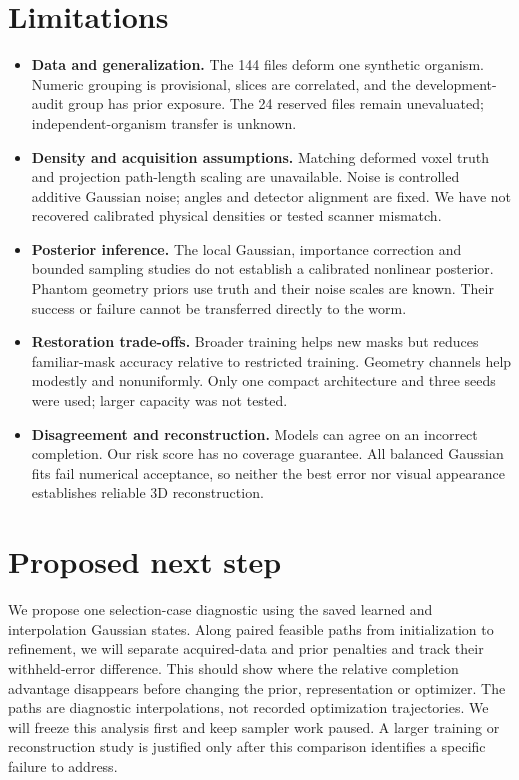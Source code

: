 \documentclass[11pt,a4paper]{article}
\begin{document}
\newpage
\section{Limitations}
\begin{itemize}
\item \textbf{Data and generalization.} The 144 files deform one synthetic organism. Numeric grouping is provisional, slices are correlated, and the development-audit group has prior exposure. The 24 reserved files remain unevaluated; independent-organism transfer is unknown.
\item \textbf{Density and acquisition assumptions.} Matching deformed voxel truth and projection path-length scaling are unavailable. Noise is controlled additive Gaussian noise; angles and detector alignment are fixed. We have not recovered calibrated physical densities or tested scanner mismatch.
\item \textbf{Posterior inference.} The local Gaussian, importance correction and bounded sampling studies do not establish a calibrated nonlinear posterior. Phantom geometry priors use truth and their noise scales are known. Their success or failure cannot be transferred directly to the worm.
\item \textbf{Restoration trade-offs.} Broader training helps new masks but reduces familiar-mask accuracy relative to restricted training. Geometry channels help modestly and nonuniformly. Only one compact architecture and three seeds were used; larger capacity was not tested.
\item \textbf{Disagreement and reconstruction.} Models can agree on an incorrect completion. Our risk score has no coverage guarantee. All balanced Gaussian fits fail numerical acceptance, so neither the best error nor visual appearance establishes reliable 3D reconstruction.
\end{itemize}
\section{Proposed next step}
We propose one selection-case diagnostic using the saved learned and interpolation Gaussian states. Along paired feasible paths from initialization to refinement, we will separate acquired-data and prior penalties and track their withheld-error difference. This should show where the relative completion advantage disappears before changing the prior, representation or optimizer. The paths are diagnostic interpolations, not recorded optimization trajectories. We will freeze this analysis first and keep sampler work paused. A larger training or reconstruction study is justified only after this comparison identifies a specific failure to address.
\end{document}
